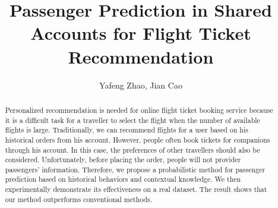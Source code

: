 \documentclass{llncs}
\begin{document}
\title{Passenger Prediction in Shared Accounts for Flight Ticket Recommendation}

%


\author{Yafeng Zhao, Jian Cao}


\maketitle
\begin{abstract}
Personalized recommendation is needed for online flight ticket booking service because it is a difficult task for a traveller to select the flight when the number of available flights is large. Traditionally, we can recommend flights for a user based on his historical orders from his account. However, people often book tickets for companions through his account. In this case, the preferences of other travellers should also be considered. Unfortunately, before placing the order, people will not provider passengers' information. Therefore, we propose a probabilistic method for passenger prediction based on historical behaviors and contextual knowledge. We then experimentally demonstrate its effectiveness on a real dataset. The result shows that our method outperforms conventional methods.\\
\end{abstract}
\end{document}
